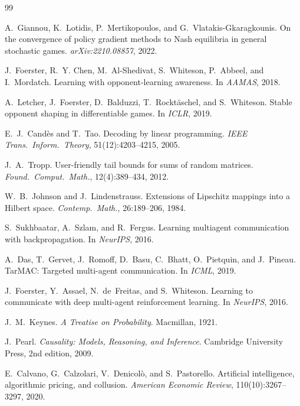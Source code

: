 \documentclass[11pt,a4paper]{article}
\begin{document}
\begin{thebibliography}{99}

A.~Giannou, K.~Lotidis, P.~Mertikopoulos, and G.~Vlatakis-Gkaragkounis.
\newblock On the convergence of policy gradient methods to Nash equilibria
in general stochastic games.
\newblock \emph{arXiv:2210.08857}, 2022.

J.~Foerster, R.~Y. Chen, M.~Al-Shedivat, S.~Whiteson, P.~Abbeel, and I.~Mordatch.
\newblock Learning with opponent-learning awareness.
\newblock In \emph{AAMAS}, 2018.

A.~Letcher, J.~Foerster, D.~Balduzzi, T.~Rockt{\"a}schel, and S.~Whiteson.
\newblock Stable opponent shaping in differentiable games.
\newblock In \emph{ICLR}, 2019.

E.~J.~Cand{\`e}s and T.~Tao.
\newblock Decoding by linear programming.
\newblock \emph{IEEE Trans.\ Inform.\ Theory}, 51(12):4203--4215, 2005.

J.~A.~Tropp.
\newblock User-friendly tail bounds for sums of random matrices.
\newblock \emph{Found.\ Comput.\ Math.}, 12(4):389--434, 2012.

W.~B.~Johnson and J.~Lindenstrauss.
\newblock Extensions of Lipschitz mappings into a Hilbert space.
\newblock \emph{Contemp.\ Math.}, 26:189--206, 1984.

S.~Sukhbaatar, A.~Szlam, and R.~Fergus.
\newblock Learning multiagent communication with backpropagation.
\newblock In \emph{NeurIPS}, 2016.

A.~Das, T.~Gervet, J.~Romoff, D.~Basu, C.~Bhatt, O.~Pietquin, and J.~Pineau.
\newblock TarMAC: Targeted multi-agent communication.
\newblock In \emph{ICML}, 2019.

J.~Foerster, Y.~Assael, N.~de~Freitas, and S.~Whiteson.
\newblock Learning to communicate with deep multi-agent reinforcement learning.
\newblock In \emph{NeurIPS}, 2016.

J.~M.~Keynes.
\newblock \emph{A Treatise on Probability}.
\newblock Macmillan, 1921.

J.~Pearl.
\newblock \emph{Causality: Models, Reasoning, and Inference}.
\newblock Cambridge University Press, 2nd edition, 2009.

E.~Calvano, G.~Calzolari, V.~Denicol{\`o}, and S.~Pastorello.
\newblock Artificial intelligence, algorithmic pricing, and collusion.
\newblock \emph{American Economic Review}, 110(10):3267--3297, 2020.


\end{thebibliography}
\end{document}
